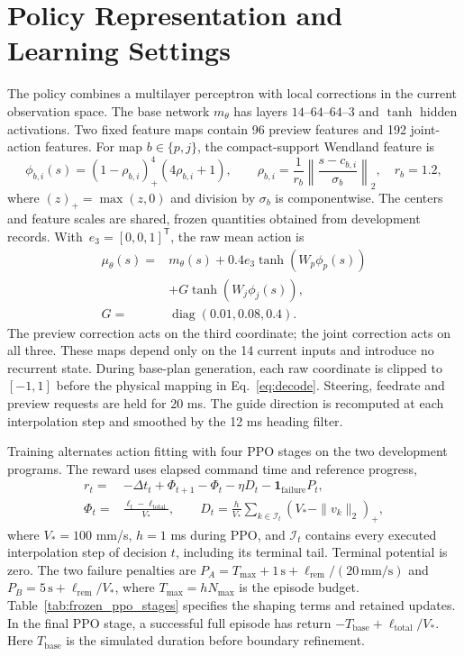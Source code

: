 \documentclass[preprint,12pt]{elsarticle}
\begin{document}
\section{Policy Representation and Learning Settings}
\label{app:learning}
The policy combines a multilayer perceptron with local corrections in the current observation space. The base network $m_\theta$ has layers $14$--$64$--$64$--$3$ and $\tanh$ hidden activations. Two fixed feature maps contain 96 preview features and 192 joint-action features. For map $b\in\{p,j\}$, the compact-support Wendland feature is
\begin{equation}
\phi_{b,i}(s)=(1-\rho_{b,i})_+^4(4\rho_{b,i}+1),
\qquad
\rho_{b,i}=\frac{1}{r_b}\left\|\frac{s-c_{b,i}}{\sigma_b}\right\|_2,
\quad r_b=1.2,
\label{eq:frozen_wendland}
\end{equation}
where $(z)_+=\max(z,0)$ and division by $\sigma_b$ is componentwise. The centers and feature scales are shared, frozen quantities obtained from development records. \mbox{With $e_3=[0,0,1]^{\mathsf T}$}, the raw mean action is
\begin{equation}
\begin{aligned}
\mu_\theta(s)={}&m_\theta(s)+0.4e_3\tanh\!\left(W_p\phi_p(s)\right)\\
&+G\tanh\!\left(W_j\phi_j(s)\right),\\
G={}&\operatorname{diag}(0.01,0.08,0.4).
\end{aligned}
\label{eq:policy_mean_main}
\end{equation}
The preview correction acts on the third coordinate; the joint correction acts on all three. These maps depend only on the 14 current inputs and introduce no recurrent state. During base-plan generation, each raw coordinate is clipped to $[-1,1]$ before the physical mapping in Eq.~\eqref{eq:decode}. Steering, feedrate and preview requests are held for 20 ms. The guide direction is recomputed at each interpolation step and smoothed by the 12 ms heading filter.

Training alternates action fitting with four PPO stages on the two development programs. The reward uses elapsed command time and reference progress,
\begin{equation}
\begin{split}
r_t={}&-\Delta t_t+\Phi_{t+1}-\Phi_t
-\eta D_t-\mathbf{1}_{\mathrm{failure}}P_t,\\
\Phi_t={}&\frac{\ell_t-\ell_{\mathrm{total}}}{V_*},
\qquad
D_t=\frac{h}{V_*}\sum_{k\in\mathcal I_t}(V_*-\|v_k\|_2)_+,
\end{split}
\label{eq:training_reward_stages}
\end{equation}
where $V_*=100$ mm/s, $h=1$ ms during PPO, and $\mathcal I_t$ contains every executed interpolation step of decision $t$, including its terminal tail. Terminal potential is zero. The two failure penalties are $P_A=T_{\max}+1\,\mathrm{s}+\ell_{\mathrm{rem}}/(20\,\mathrm{mm/s})$ and $P_B=5\,\mathrm{s}+\ell_{\mathrm{rem}}/V_*$, where $T_{\max}=hN_{\max}$ is the episode budget. Table~\ref{tab:frozen_ppo_stages} specifies the shaping terms and retained updates. In the final PPO stage, a successful full episode has return $-T_{\mathrm{base}}+\ell_{\mathrm{total}}/V_*$. Here $T_{\mathrm{base}}$ is the simulated duration before boundary refinement.
\end{document}
